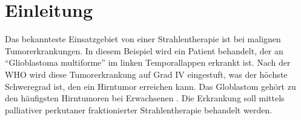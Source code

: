 \section{Einleitung}
\label{sec:Einleitung}

Das bekannteste Einsatzgebiet von einer Strahlentherapie ist bei malignen Tumorerkrankungen.
In diesem Beispiel wird ein Patient behandelt, der an \enquote{Glioblastoma multiforme} im linken Temporallappen erkrankt ist.
Nach der WHO wird diese Tumorerkrankung auf Grad IV eingestuft, was der höchste Schweregrad ist, den ein Hirntumor erreichen kann.
Das Globlastom gehört zu den häufigsten Hirntumoren bei Erwachsenen \cite{Glioblastom}.
Die Erkrankung soll mittels palliativer perkutaner fraktionierter Strahlentherapie behandelt werden.
